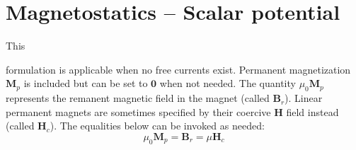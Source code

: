\documentclass[letterpaper]{article}
\newcommand{\vect}[1]{\mathbf#1}
\begin{document}
\clearpage
\section{Magnetostatics -- Scalar potential}
\label{sec_msp}

\hypertarget{sec_msp}{This} formulation is applicable when no free currents exist. Permanent magnetization $\vect{M}_p$ is included but can be set to $\vect{0}$ when not needed. 
The quantity $\mu_0\vect{M}_{p}$ represents the remanent magnetic field in the magnet (called $\vect{B}_r$). Linear permanent magnets are sometimes specified by their coercive $\vect{H}$ field instead (called $\vect{H}_c$). The equalities below can be invoked as needed:
\begin{equation}
\label{eqMBrHc}
\mu_0\vect{M}_{p}=\vect{B}_r=\mu\vect{H}_c
\end{equation}
\end{document}
